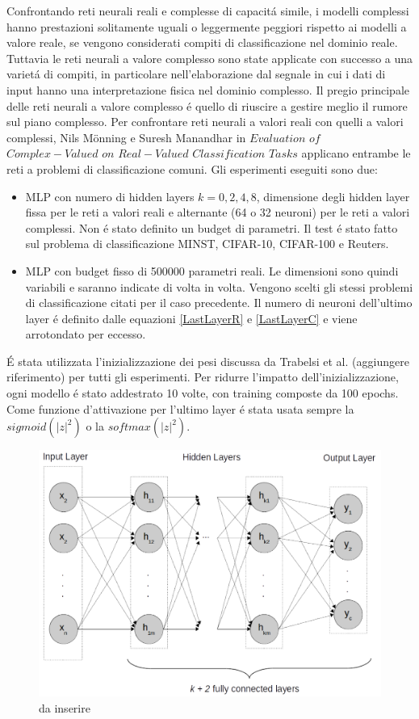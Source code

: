 \documentclass[a4paper,10pt]{article}
\begin{document}
 
 Confrontando reti neurali reali e complesse di capacit\'a simile, i modelli complessi hanno prestazioni solitamente uguali o leggermente peggiori rispetto ai modelli a valore reale, se vengono considerati compiti di classificazione nel dominio reale. Tuttavia le reti neurali a valore complesso sono state applicate con successo a una variet\'a di compiti, in particolare nell'elaborazione dal segnale in cui i dati di input hanno una interpretazione fisica nel dominio complesso. Il pregio principale delle reti neurali a valore complesso \'e quello di riuscire a gestire meglio il rumore sul piano complesso.
 Per confrontare reti neurali a valori reali con quelli a valori complessi, Nils M\"onning e Suresh Manandhar in $Evaluation$ $of$ $Complex-Valued$ $on$ $Real-Valued$ $Classification$ $Tasks$ applicano entrambe le reti a problemi di classificazione comuni. Gli esperimenti eseguiti sono due:
 \begin{itemize}
  \item MLP con numero di hidden layers $k = 0, 2, 4, 8$, dimensione degli hidden layer fissa per le reti a valori reali e alternante (64 o 32 neuroni) per le reti a valori complessi. Non \'e stato definito un budget di parametri. Il test \'e stato fatto sul problema di classificazione MINST, CIFAR-10, CIFAR-100 e Reuters. 
  \item MLP con budget fisso di 500000 parametri reali. Le dimensioni sono quindi variabili e saranno indicate di volta in volta. Vengono scelti gli stessi problemi di classificazione citati per il caso precedente. Il numero di neuroni dell'ultimo layer \'e definito dalle equazioni \ref{LastLayerR} e \ref{LastLayerC} e viene arrotondato per eccesso.
 \end{itemize}
 
 \'E stata utilizzata l'inizializzazione dei pesi discussa da Trabelsi et al. (aggiungere riferimento) per tutti gli esperimenti. Per ridurre l'impatto dell'inizializzazione, ogni modello \'e stato addestrato 10 volte, con training composte da 100 epochs. Come funzione d'attivazione per l'ultimo layer \'e stata usata sempre la $sigmoid(|z|^2)$ o la $softmax(|z|^2)$.
 
 \begin{figure}[h!]
  \centering
  \includegraphics[scale=0.3]{MLP.png}
  \caption{da inserire}
  \label{MLPpng}
 \end{figure}
 
\end{document}
